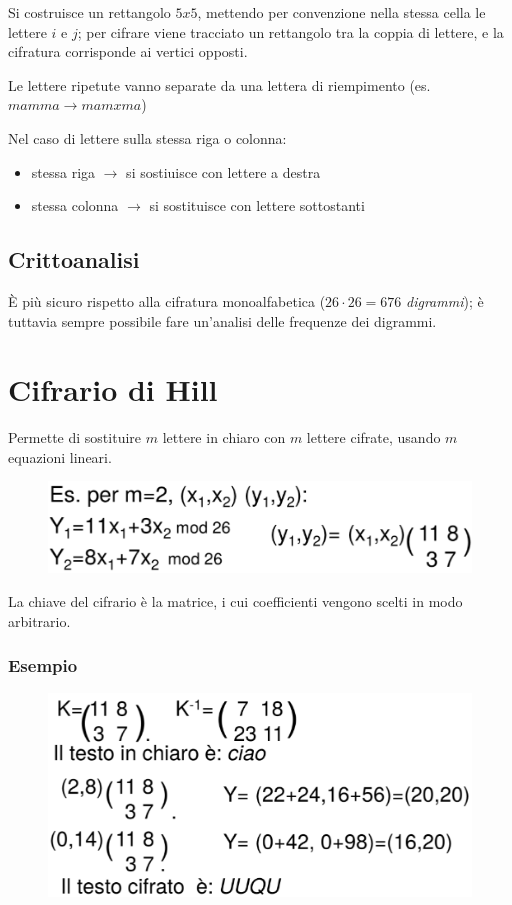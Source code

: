 \noindent Si costruisce un rettangolo $5x5$, mettendo per convenzione nella stessa 
cella le lettere $i$ e $j$; per cifrare viene tracciato un rettangolo tra 
la coppia di lettere, e la cifratura corrisponde ai vertici opposti. 

\noindent Le lettere ripetute vanno separate da una lettera di riempimento (es. $mamma \rightarrow
mamxma$)

\noindent Nel caso di lettere sulla stessa riga o colonna:
\begin{itemize}
    \item stessa riga $\rightarrow$ si sostiuisce con lettere a destra 
    \item stessa colonna $\rightarrow$ si sostituisce con lettere sottostanti
\end{itemize}

\subsection{Crittoanalisi}

È più sicuro rispetto alla cifratura monoalfabetica ($26\cdot26=676$ \textit{digrammi}); è tuttavia 
sempre possibile fare un'analisi delle frequenze dei digrammi.

\section{Cifrario di Hill}

Permette di 
sostituire $m$ lettere in chiaro con $m$ lettere cifrate, usando $m$ equazioni 
lineari. 

\begin{figure}[H]
    \centering 
    \includegraphics[width=0.8\linewidth]{chapters/chap02/images/hill.png}
\end{figure}

La chiave del cifrario è la matrice, i cui coefficienti vengono scelti in modo arbitrario.

\subsubsection{Esempio}

\begin{figure}[H]
    \centering 
    \includegraphics[width=0.65\linewidth]{chapters/chap02/images/hill2.png}
\end{figure}

